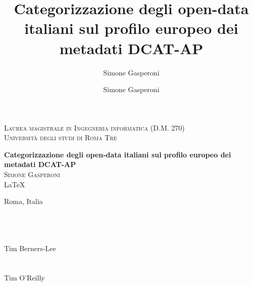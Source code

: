 \documentclass{article}
\author{Simone Gasperoni}
\author{Simone Gasperoni}
\title{Categorizzazione degli open-data italiani sul profilo europeo dei metadati DCAT-AP}
\theoremstyle{plain}
\theoremstyle{definition}
\begin{document}
\begin{titlepage}
\begin{center}

\textsc{Laurea magistrale in Ingegneria informatica (D.M. 270)}\\[0.5cm]
\textsc{Università degli studi di Roma Tre}\\[0.5cm]

\hrulefill

{ \huge \bfseries Categorizzazione degli open-data italiani sul profilo europeo dei metadati DCAT-AP \\[0.4cm] }
\textsc{\Large Simone Gasperoni}\\[0.5cm]
\vfill
\LaTeX


Roma, Italia
\end{center}
\end{titlepage}


\tableofcontents


\newpage

\vspace*{\fill}
\textit{
\\
\\
} 
\\
Tim Berners-Lee
\\
\\
\textit{
}
\\
Tim O'Reilly 
\vspace*{\fill}
\newpage

\newpage
\end{document}
